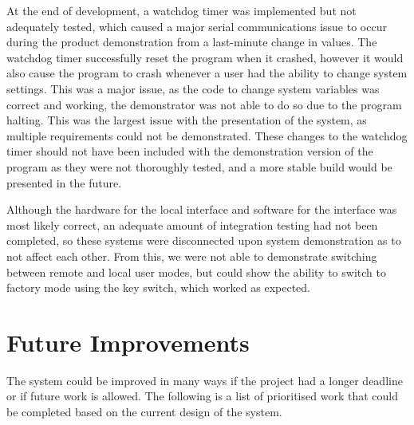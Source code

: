 \documentclass[]{report}
\begin{document}
At the end of development, a watchdog timer was implemented but not adequately tested, which caused a major serial communications issue to occur during the product demonstration from a last-minute change in values. The watchdog timer successfully reset the program when it crashed, however it would also cause the program to crash whenever a user had the ability to change system settings. This was a major issue, as the code to change system variables was correct and working, the demonstrator was not able to do so due to the program halting. This was the largest issue with the presentation of the system, as multiple requirements could not be demonstrated. These changes to the watchdog timer should not have been included with the demonstration version of the program as they were not thoroughly tested, and a more stable build would be presented in the future.  

Although the hardware for the local interface and software for the interface was most likely correct, an adequate amount of integration testing had not been completed, so these systems were disconnected upon system demonstration as to not affect each other. From this, we were not able to demonstrate switching between remote and local user modes, but could show the ability to switch to factory mode using the key switch, which worked as expected. 

\section{Future Improvements}
The system could be improved in many ways if the project had a longer deadline or if future work is allowed. The following is a list of prioritised work that could be completed based on the current design of the system. 
\end{document}
